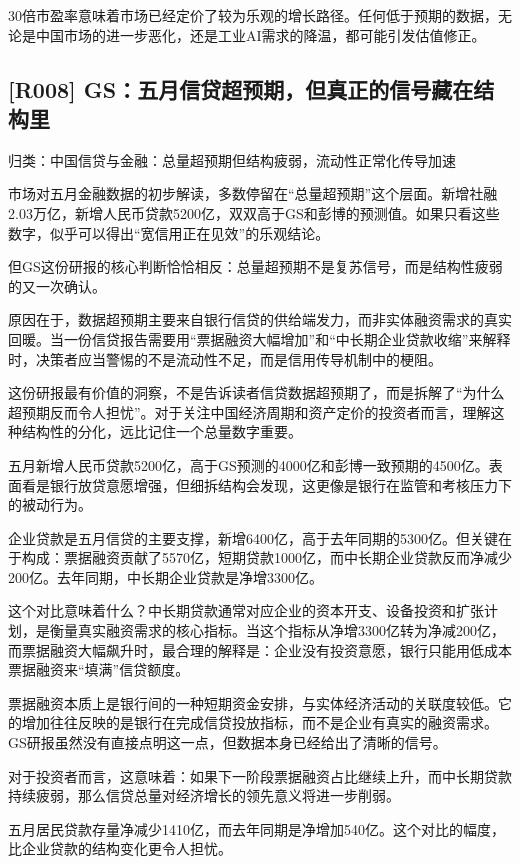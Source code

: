 \documentclass[11pt]{ctexart}
\begin{document}
30倍市盈率意味着市场已经定价了较为乐观的增长路径。任何低于预期的数据，无论是中国市场的进一步恶化，还是工业AI需求的降温，都可能引发估值修正。

\subsection{[R008] GS：五月信贷超预期，但真正的信号藏在结构里}
{\small\color{refgray}归类：中国信贷与金融：总量超预期但结构疲弱，流动性正常化传导加速}

市场对五月金融数据的初步解读，多数停留在“总量超预期”这个层面。新增社融2.03万亿，新增人民币贷款5200亿，双双高于GS和彭博的预测值。如果只看这些数字，似乎可以得出“宽信用正在见效”的乐观结论。

但GS这份研报的核心判断恰恰相反：总量超预期不是复苏信号，而是结构性疲弱的又一次确认。

原因在于，数据超预期主要来自银行信贷的供给端发力，而非实体融资需求的真实回暖。当一份信贷报告需要用“票据融资大幅增加”和“中长期企业贷款收缩”来解释时，决策者应当警惕的不是流动性不足，而是信用传导机制中的梗阻。

这份研报最有价值的洞察，不是告诉读者信贷数据超预期了，而是拆解了“为什么超预期反而令人担忧”。对于关注中国经济周期和资产定价的投资者而言，理解这种结构性的分化，远比记住一个总量数字重要。

五月新增人民币贷款5200亿，高于GS预测的4000亿和彭博一致预期的4500亿。表面看是银行放贷意愿增强，但细拆结构会发现，这更像是银行在监管和考核压力下的被动行为。

企业贷款是五月信贷的主要支撑，新增6400亿，高于去年同期的5300亿。但关键在于构成：票据融资贡献了5570亿，短期贷款1000亿，而中长期企业贷款反而净减少200亿。去年同期，中长期企业贷款是净增3300亿。

这个对比意味着什么？中长期贷款通常对应企业的资本开支、设备投资和扩张计划，是衡量真实融资需求的核心指标。当这个指标从净增3300亿转为净减200亿，而票据融资大幅飙升时，最合理的解释是：企业没有投资意愿，银行只能用低成本票据融资来“填满”信贷额度。

票据融资本质上是银行间的一种短期资金安排，与实体经济活动的关联度较低。它的增加往往反映的是银行在完成信贷投放指标，而不是企业有真实的融资需求。GS研报虽然没有直接点明这一点，但数据本身已经给出了清晰的信号。

对于投资者而言，这意味着：如果下一阶段票据融资占比继续上升，而中长期贷款持续疲弱，那么信贷总量对经济增长的领先意义将进一步削弱。

五月居民贷款存量净减少1410亿，而去年同期是净增加540亿。这个对比的幅度，比企业贷款的结构变化更令人担忧。
\end{document}
